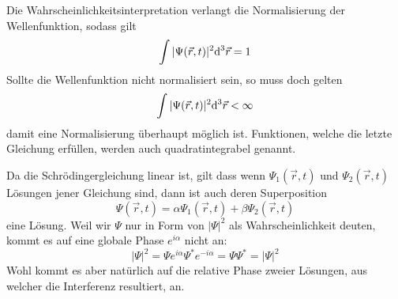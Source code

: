 \begin{bemerkung*}
	Die Wahrscheinlichkeitsinterpretation verlangt die Normalisierung der Wellenfunktion, sodass gilt
	$$\int |\Psi(\vec{r}, t)|^2 \mathrm d^3 \vec{r} = 1$$
	Sollte die Wellenfunktion nicht normalisiert sein, so muss doch gelten
	$$\int |\Psi(\vec{r}, t)|^2 \mathrm d^3 \vec{r} < \infty$$
	damit eine Normalisierung überhaupt möglich ist. Funktionen, welche die letzte Gleichung erfüllen, werden auch quadratintegrabel genannt.
\end{bemerkung*}
\begin{bemerkung*}[Superpositionsprinzip]
	Da die Schrödingergleichung linear ist, gilt dass wenn $\Psi_1(\vec{r}, t)$ und $\Psi_2(\vec{r}, t)$ Lösungen jener Gleichung sind, dann ist auch deren Superposition
	$$\Psi(\vec{r}, t) = \alpha \Psi_1(\vec{r}, t) + \beta \Psi_2(\vec{r}, t)$$
	eine Lösung. Weil wir $\Psi$ nur in Form von $|\Psi|^2$ als Wahrscheinlichkeit deuten, kommt es auf eine globale Phase $e^{i\alpha}$ nicht an:
	$$|\Psi|^2 = \Psi e^{i\alpha} \Psi^\ast e^{-i\alpha} = \Psi \Psi^\ast = |\Psi|^2$$
	Wohl kommt es aber natürlich auf die relative Phase zweier Lösungen, aus welcher die Interferenz resultiert, an.
\end{bemerkung*}

